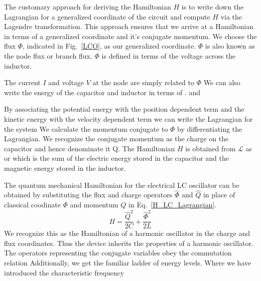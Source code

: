 The customary approach for deriving the Hamiltonian $H$ is to write down the Lagrangian for a generalized coordinate of the circuit and compute $H$ via the Lagendre transformation.
This approach ensures that we arrive at a Hamiltonian in terms of a generalized coordinate and it's conjugate momentum.
We choose the flux $\Phi$, indicated in Fig.~\ref{LCO}, as our generalized coordinate.  $\Phi$ is also known as the node flux or branch flux.  $\Phi$ is defined in terms of the voltage across the inductor.

\noindent
The current $I$ and voltage $V$ at the node are simply related to $\Phi$
We can also write the energy of the capacitor and inductor in terms of \Phi.
and

\noindent
By associating the potential energy with the position dependent term and the kinetic energy with the velocity dependent term we can write the Lagrangian for the system
We calculate the momentum conjugate to $\Phi$ by differentiating the Lagrangian.
We recognize the conjugate momentum as the charge on the capacitor and hence denominate it Q.
The Hamiltonian $H$ is obtained from $\mathcal{L}$ as
or
which is the sum of the electric energy stored in the capacitor and the magnetic energy stored in the inductor.

The quantum mechanical Hamiltonian for the electrical LC oscillator can be obtained by substituting the flux and charge operators $\hat{\Phi}$ and $\hat{Q}$
in place of classical coodinate $\Phi$ and momentum $Q$ in Eq.~\ref{H_LC_Lagrangian}.
\begin{equation}
    H = \frac{\hat{Q}^2}{2C} + \frac{\hat{\Phi}^2}{2L}
\end{equation}
We recognize this as the Hamiltonian of a harmonic oscillator in the charge and flux coordinates.
Thus the device inherits the properties of a harmonic oscillator.
The operators representing the conjugate variables obey the commutation relation
Additionally, we get the familiar ladder of energy levels.
Where we have introduced the characteristic frequency

